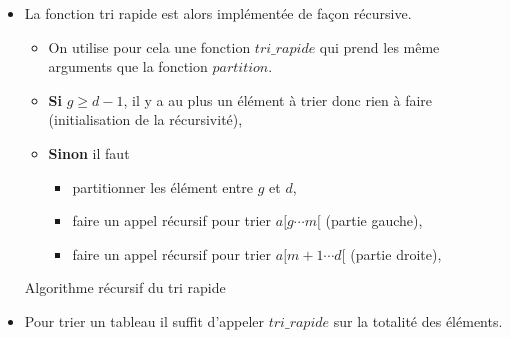 \begin{itemize}
\item La fonction tri rapide est alors implémentée de façon récursive.
\begin{itemize}
\item On utilise pour cela une fonction \textbf{$tri\_rapide$} qui prend les même arguments que la fonction \textbf{$partition$}.
\item \textbf{Si} \textbf{$g\geq d-1$}, il y a au plus un élément à trier donc rien à faire (initialisation de la récursivité),
\item \textbf{Sinon} il faut
\begin{itemize}
\item partitionner les élément entre \textbf{$g$} et \textbf{$d$},
\item faire un appel récursif pour trier $a[g\cdots m[$ (partie gauche),
\item faire un appel récursif pour trier $a[m+1\cdots d[$ (partie droite),
\end{itemize} 
\end{itemize} 

\begin{algorithme}{Algorithme récursif du tri rapide}
\ifprof
\begin{center}
		
\end{center}
\fi
\end{algorithme}

\item Pour trier un tableau il suffit d'appeler \textbf{$tri\_rapide$} sur la totalité des éléments.

\end{itemize}

\begin{exemple2}

\ifprof
\begin{center}
		
\end{center}
\fi

\end{exemple2}


